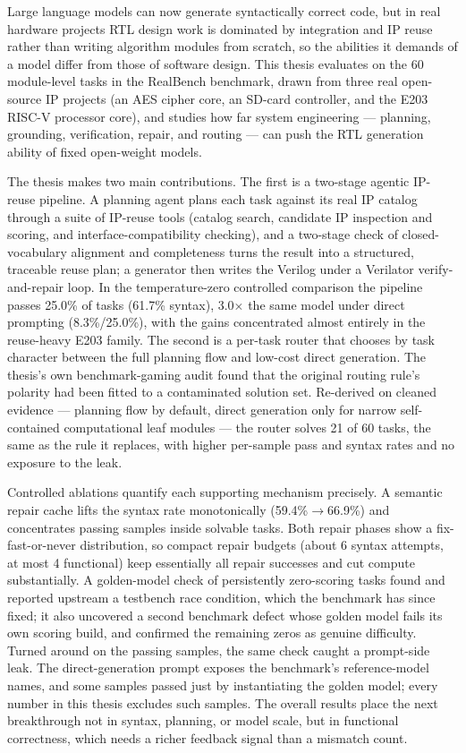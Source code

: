 \begin{abstract*}

Large language models can now generate syntactically correct code, but in
real hardware projects RTL design work is dominated by integration and IP
reuse rather than writing algorithm modules from scratch, so the abilities
it demands of a model differ from those of software design. This thesis
evaluates on the 60 module-level tasks in the RealBench benchmark, drawn
from three real open-source IP projects (an AES cipher core, an SD-card
controller, and the E203 RISC-V processor core), and studies how far
system engineering --- planning, grounding, verification, repair, and
routing --- can push the RTL generation ability of fixed open-weight
models.

The thesis makes two main contributions. The first is a two-stage agentic
IP-reuse pipeline. A planning agent plans each task against its real IP
catalog through a suite of IP-reuse tools (catalog search, candidate IP
inspection and scoring, and interface-compatibility checking), and a
two-stage check of closed-vocabulary alignment and completeness turns the
result into a structured, traceable reuse plan; a generator then writes
the Verilog under a Verilator verify-and-repair loop. In the
temperature-zero controlled comparison the pipeline passes 25.0\% of
tasks (61.7\% syntax), 3.0$\times$ the same model under direct prompting
(8.3\%/25.0\%), with the gains concentrated almost entirely in the
reuse-heavy E203 family. The second is a per-task router that chooses by
task character between the full planning flow and low-cost direct
generation. The thesis's own benchmark-gaming audit found that the
original routing rule's polarity had been fitted to a contaminated
solution set. Re-derived on cleaned evidence --- planning flow by
default, direct generation only for narrow self-contained computational
leaf modules --- the router solves 21 of 60 tasks, the same as the rule
it replaces, with higher per-sample pass and syntax rates and no exposure
to the leak.

Controlled ablations quantify each supporting mechanism precisely.
A semantic repair cache lifts the syntax rate monotonically
(59.4\%$\to$66.9\%) and concentrates passing samples inside solvable
tasks. Both repair phases show a fix-fast-or-never distribution, so
compact repair budgets (about 6 syntax attempts, at most 4 functional)
keep essentially all repair successes and cut compute substantially.
A golden-model check of persistently zero-scoring tasks found and
reported upstream a testbench race condition, which the benchmark has
since fixed; it also uncovered a second benchmark defect whose golden
model fails its own scoring build, and confirmed the remaining zeros as
genuine difficulty. Turned around on the passing samples, the same check
caught a prompt-side leak. The direct-generation prompt exposes the
benchmark's reference-model names, and some samples passed just by
instantiating the golden model; every number in this thesis excludes
such samples. The overall results place the next breakthrough not in
syntax, planning, or model scale, but in functional correctness, which
needs a richer feedback signal than a mismatch count.

\end{abstract*}
